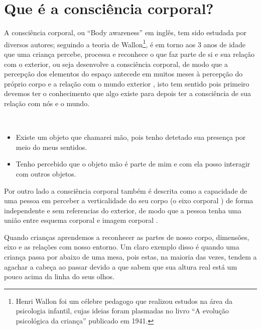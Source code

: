 \section{Que é a consciência corporal?}
\label{sec:BodyAwareness}
A consciência corporal, ou  ``Body awareness'' em inglês, 
tem sido estudada por diversos autores;
seguindo a teoria de Wallon\footnote{Henri Wallon 
foi um célebre pedagogo que realizou estudos na área da psicologia infantil, 
cujas ideias foram plasmadas no livro ``A evolução psicológica da criança'' publicado em 1941.}, 
é em torno aos 3 anos de idade que uma criança percebe, processa e reconhece
o que faz parte de si e sua relação com o exterior, ou seja desenvolve a consciência corporal,
de modo que a percepção dos elementos do espaço antecede em muitos meses à 
percepção do próprio corpo e a relação com o mundo exterior
\cite{Garanhani2015} \cite{bueno2016psicomotricidade} \cite[pp. 154, 220]{wallon1968evoluccao}
\cite[pp. 14]{bolio2006fantasia},
isto tem sentido pois primeiro devemos ter o conhecimento que algo existe para 
depois ter a consciência de sua relação com nós e o mundo.
\begin{example}~

\begin{itemize}
\item Existe um objeto que chamarei mão, pois tenho detetado sua presença por meio do meus sentidos.
\item Tenho percebido que o objeto mão é parte de mim e com ela posso interagir com outros 
objetos. 
\end{itemize}
\end{example}
Por outro lado a consciência corporal também é descrita como a 
capacidade de uma pessoa em perceber a verticalidade do seu corpo 
(o eixo corporal \cite{bueno2016psicomotricidade}) de forma independente e 
sem referencias do exterior, 
de modo que a pessoa tenha uma união entre esquema corporal e imagem corporal \cite[pp. 14]{balcells2002expresion}.
\begin{example}
Quando crianças aprendemos a reconhecer as partes de nosso corpo, dimensões, eixo e as relações com nosso entorno.
Um claro exemplo disso é quando uma criança passa por abaixo de uma mesa, 
pois estas, na maioria das vezes, tendem a agachar a cabeça ao passar 
devido a que sabem que sua altura real está 
um pouco acima da linha do seus olhos.
\end{example}

